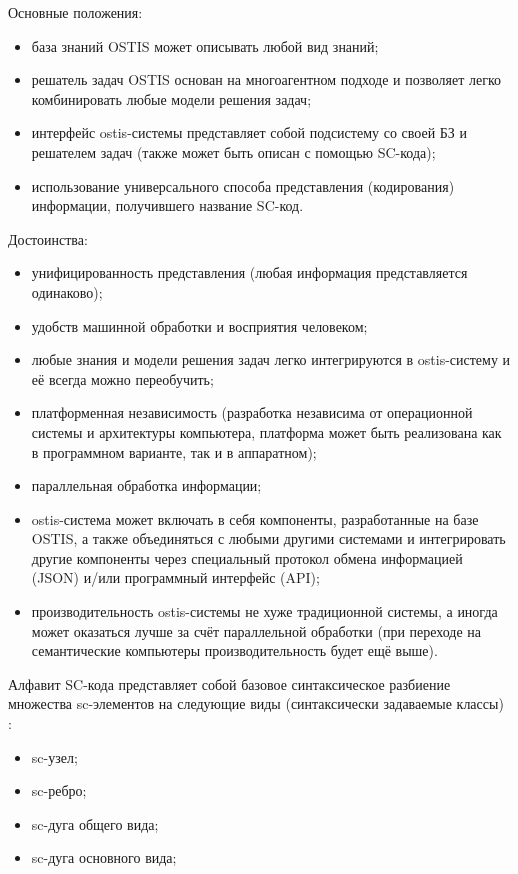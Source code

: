 Основные положения:
\begin{itemize}
	\item база знаний OSTIS может описывать любой вид знаний; 
	\item решатель задач OSTIS основан на многоагентном подходе и позволяет легко комбинировать любые модели решения задач;
	\item интерфейс ostis-системы представляет собой подсистему со своей БЗ и решателем задач (также может быть описан с помощью SC-кода);
	\item использование универсального способа представления (кодирования) информации, получившего название SC-код.
\end{itemize}

Достоинства:
\begin{itemize}
	\item унифицированность представления (любая информация представляется одинаково); 
	\item удобств машинной обработки и восприятия человеком;
	\item любые знания и модели решения задач легко интегрируются в ostis-систему и её всегда можно переобучить;
	\item платформенная независимость (разработка независима от операционной системы и архитектуры компьютера, платформа может быть реализована как в программном варианте, так и в аппаратном);
	\item параллельная обработка информации;
	\item ostis-система может включать в себя компоненты, разработанные на базе OSTIS, а также объединяться с любыми другими системами и интегрировать другие компоненты через специальный протокол обмена информацией (JSON) и/или программный интерфейс (API);
	\item производительность ostis-системы не хуже традиционной системы, а иногда может оказаться лучше за счёт параллельной обработки (при переходе на семантические компьютеры производительность будет ещё выше).
\end{itemize}

Алфавит SC-кода представляет собой базовое синтаксическое разбиение множества sc-элементов на следующие виды (синтаксически задаваемые классы) \cite{OSTIS}:
\begin{itemize}
	\item sc-узел;
	\item sc-ребро;
	\item sc-дуга общего вида;
	\item sc-дуга основного вида;
\end{itemize}

